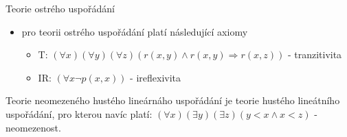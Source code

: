 \documentclass{szzclass}
\begin{document}
Teorie ostrého uspořádání
\begin{itemize}
  \item pro teorii ostrého uspořádání platí následující axiomy
  \begin{itemize}
    \item T: $(\forall{x})(\forall{y})(\forall{z})(r(x,y) \wedge r(x,y) \Rightarrow r(x,z))$ - tranzitivita
    \item IR: $(\forall{x}\neg p(x,x))$ - ireflexivita
  \end{itemize}
\end{itemize}
Teorie neomezeného hustého lineárnáho uspořádání je teorie hustého lineátního uspořádání, pro kterou navíc platí:
$(\forall{x})(\exists{y})(\exists{z})(y < x \wedge x < z)$ - neomezenost.
\end{document}
